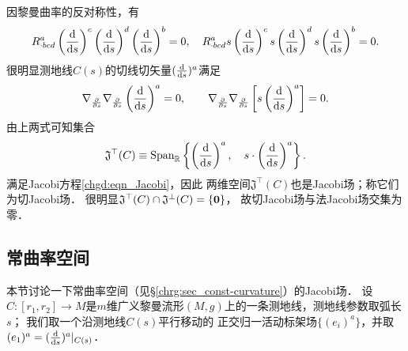 因黎曼曲率的反对称性，有
\begin{equation*}
    R^{a}_{\cdot bcd} \left(\frac{{\rm d}}{{\rm d}s}\right)^c
    \left(\frac{{\rm d}}{{\rm d}s}\right)^d \left(\frac{{\rm d}}{{\rm d}s}\right)^b =0, \quad
    R^{a}_{\cdot bcd} s\left(\frac{{\rm d}}{{\rm d}s}\right)^c
    s\left(\frac{{\rm d}}{{\rm d}s}\right)^d s\left(\frac{{\rm d}}{{\rm d}s}\right)^b =0   .
\end{equation*}
很明显测地线$C(s)$的切线切矢量$(\frac{{\rm d}}{{\rm d}s})^a$满足
\begin{equation*}
    \nabla_{\frac{\partial}{\partial s}} \nabla_{\frac{\partial}{\partial s}}
      \left(\frac{{\rm d}}{{\rm d}s}\right)^a =0, \qquad
    \nabla_{\frac{\partial}{\partial s}} \nabla_{\frac{\partial}{\partial s}}
      \left[s \left(\frac{{\rm d}}{{\rm d}s}\right)^a\right] =0  .
\end{equation*}
由上两式可知集合
\begin{equation}
    \mathfrak{J}^{\top}(C) \equiv {\rm Span}_{\mathbb{R}} 
    \left\{\left(\frac{{\rm d}}{{\rm d}s}\right)^a, \quad
    s\cdot \left(\frac{{\rm d}}{{\rm d}s}\right)^a\right\} .
\end{equation}
满足Jacobi方程\eqref{chgd:eqn_Jacobi}，因此
两维空间$\mathfrak{J}^{\top}(C)$也是Jacobi场；称它们为切Jacobi场．
很明显$\mathfrak{J}^{\top}(C) \cap \mathfrak{J}^{\bot}(C) = \{{\bf 0}\}$，
故切Jacobi场与法Jacobi场交集为零．



\subsection{常曲率空间}
本节讨论一下常曲率空间（见\S \ref{chrg:sec_const-curvature}）的Jacobi场．
设$C:[r_1,r_2]\to M$是$m$维广义黎曼流形$(M,g)$上的一条测地线，测地线参数取弧长$s$；
我们取一个沿测地线$C(s)$平行移动的
正交归一活动标架场$\{(e_i)^a\}$，并取$(e_1)^a=(\frac{{\rm d}}{{\rm d}s})^a|_{C(s)}$．

